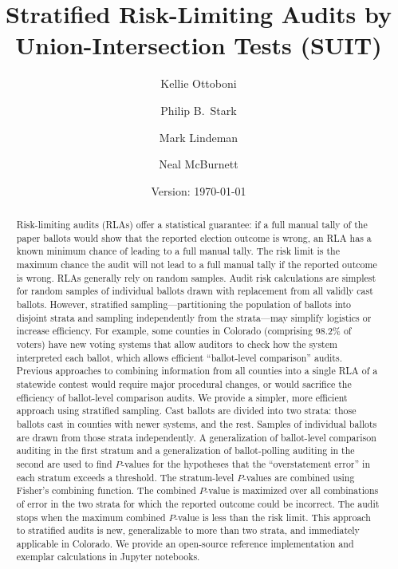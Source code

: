 \documentclass[runningheads]{llncs}
\title{Stratified Risk-Limiting Audits by Union-Intersection Tests (SUIT)}
\author{
   Kellie Ottoboni\inst{1}\orcidID{0000-0002-9107-3402} \and
   Philip B.~Stark\inst{1}\orcidID{0000-0002-3771-9604} \and
   Mark Lindeman\inst{2}\orcidID{0000-0001-8815-815X} \and
   Neal McBurnett\orcidID{0000-0001-8667-1830} 
}
\institute{
Department of Statistics, University of California, Berkeley, CA, USA \and
Verified Voting Foundation}
\date{Version: \today}
\begin{document}
\maketitle


\begin{abstract}
Risk-limiting audits (RLAs) offer a statistical guarantee: if a full manual tally of the paper ballots would show that the reported election outcome is wrong, an RLA has a known minimum chance of leading to a full manual tally.
The risk limit is the maximum chance the audit will not lead to a full manual tally if the reported outcome is wrong.
RLAs generally rely on random samples. 
Audit risk calculations are simplest for random samples of individual ballots drawn with replacement from all validly cast ballots.
However, stratified sampling---partitioning the population of ballots into disjoint
strata and sampling independently from the strata---may simplify logistics or increase efficiency.
For example, some counties in Colorado (comprising 98.2\% of voters)
have new voting systems that allow auditors to check how the system interpreted each ballot, which allows efficient ``ballot-level comparison'' audits.
Previous approaches to combining information from all counties into a single RLA of a statewide contest would require major procedural changes, or would sacrifice the efficiency of ballot-level comparison audits.
We provide a simpler, more efficient approach using stratified sampling.
Cast ballots are divided into two strata: those ballots cast in counties with newer systems, and the rest. 
Samples of individual ballots are drawn from those strata independently.
A generalization of ballot-level comparison auditing in the first stratum and a generalization of ballot-polling auditing in the second are
used to find $P$-values for the hypotheses that the ``overstatement error'' in each stratum exceeds a threshold.
The stratum-level $P$-values are combined using Fisher's combining function.
The combined $P$-value is maximized over all combinations of error in the two strata for which the reported outcome could be incorrect. 
The audit stops when the maximum combined $P$-value is less than the risk limit.
This approach to stratified audits is new, generalizable to more than two strata, and immediately applicable in Colorado.
We provide an open-source reference implementation and exemplar calculations in Jupyter notebooks.

\end{abstract}
\end{document}
